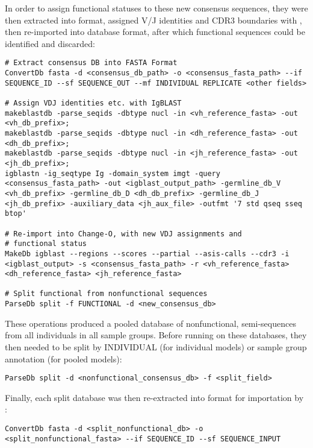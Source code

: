 \noindent In order to assign functional statuses to these new consensus sequences, they were then extracted into  format, assigned V/J identities and CDR3 boundaries with , then re-imported into  database format, after which functional sequences could be identified and discarded:

\begin{lstlisting}
# Extract consensus DB into FASTA Format
ConvertDb fasta -d <consensus_db_path> -o <consensus_fasta_path> --if SEQUENCE_ID --sf SEQUENCE_OUT --mf INDIVIDUAL REPLICATE <other fields> 

# Assign VDJ identities etc. with IgBLAST
makeblastdb -parse_seqids -dbtype nucl -in <vh_reference_fasta> -out <vh_db_prefix>;
makeblastdb -parse_seqids -dbtype nucl -in <dh_reference_fasta> -out <dh_db_prefix>;
makeblastdb -parse_seqids -dbtype nucl -in <jh_reference_fasta> -out <jh_db_prefix>;
igblastn -ig_seqtype Ig -domain_system imgt -query <consensus_fasta_path> -out <igblast_output_path> -germline_db_V <vh_db_prefix> -germline_db_D <dh_db_prefix> -germline_db_J <jh_db_prefix> -auxiliary_data <jh_aux_file> -outfmt '7 std qseq sseq btop'

# Re-import into Change-O, with new VDJ assignments and
# functional status
MakeDb igblast --regions --scores --partial --asis-calls --cdr3 -i <igblast_output> -s <consensus_fasta_path> -r <vh_reference_fasta> <dh_reference_fasta> <jh_reference_fasta>

# Split functional from nonfunctional sequences
ParseDb split -f FUNCTIONAL -d <new_consensus_db>
\end{lstlisting}

\noindent These operations produced a pooled database of nonfunctional, semi-\naive sequences from all individuals in all sample groups. Before running  on these databases, they then needed to be split by INDIVIDUAL (for individual models) or sample group annotation (for pooled models):

\begin{lstlisting}
ParseDb split -d <nonfunctional_consensus_db> -f <split_field> 
\end{lstlisting}

\noindent Finally, each split database was then re-extracted into  format for importation by :

\begin{lstlisting}
ConvertDb fasta -d <split_nonfunctional_db> -o <split_nonfunctional_fasta> --if SEQUENCE_ID --sf SEQUENCE_INPUT
\end{lstlisting}

